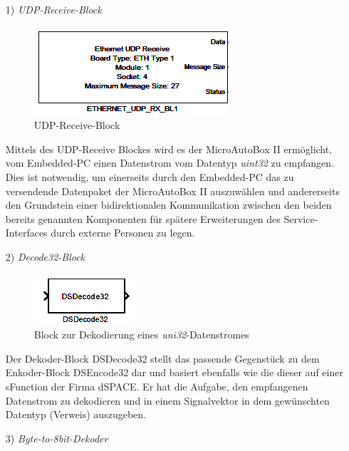 \documentclass[fontsize = 12pt, paper = a4]{scrreprt}
\begin{document}
\begin{itemize}

\item[1)] \textit{UDP-Receive-Block}

\begin{figure}[h]
\centering
\includegraphics[scale = 0.8]{eth_udp_rx}
\caption[UDP-Receive]{UDP-Receive-Block}
\label{UDP-Receive}
\end{figure}

Mittels des UDP-Receive Blockes wird es der MicroAutoBox II ermöglicht, vom Embedded-PC einen Datenstrom vom Datentyp \textit{uint32} zu empfangen. Dies ist notwendig, um einerseits durch 
den Embedded-PC das zu versendende Datenpaket der MicroAutoBox II auszuwählen und andererseits den Grundstein einer bidirektionalen Kommunikation zwischen den beiden bereits genannten Komponenten für spätere Erweiterungen des Service-Interfaces durch externe Personen zu legen.

\newpage

\item[2)] \textit{Decode32-Block}

\begin{figure}[h]
\centering
\includegraphics[scale = 0.8]{decode32}
\caption[DSDecode32-Block]{Block zur Dekodierung eines \textit{uni32}-Datenstromes}
\label{UDP-Receive}
\end{figure}

Der Dekoder-Block DSDecode32 stellt das passende Gegenstück zu dem Enkoder-Block DSEncode32 dar und basiert ebenfalls wie die dieser auf einer sFunction der Firma dSPACE. Er hat die Aufgabe, den empfangenen Datenstrom zu dekodieren und in einem Signalvektor in dem gewünschten Datentyp (Verweis) auszugeben. 

\item[3)] \textit{Byte-to-8bit-Dekoder}


\end{itemize}
\end{document}

